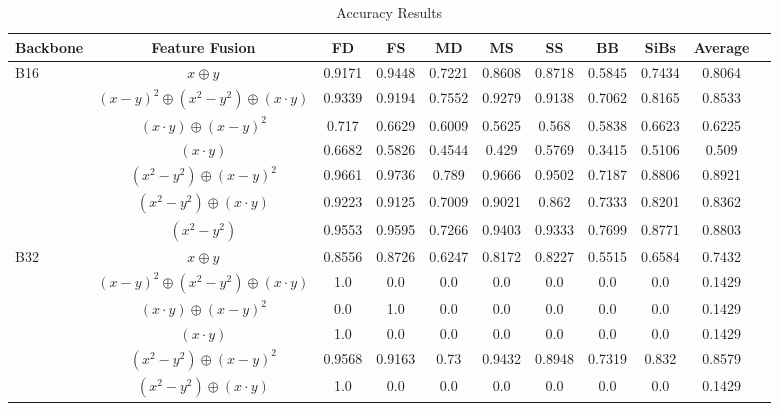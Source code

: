\documentclass{article}
\begin{document}
\begin{table}[htbp]
\centering
\caption{Accuracy Results}
\label{tab:accuracy_results}
\begin{tabular}{lcccccccccc}
\toprule
\textbf{Backbone} & \textbf{Feature Fusion} & \textbf{FD} & \textbf{FS} & \textbf{MD} & \textbf{MS} & \textbf{SS} & \textbf{BB} & \textbf{SiBs} & \textbf{Average} \\
\midrule 
\multirow{7}{*}{B16} & $x \oplus y$  & 0.9171 & 0.9448 & 0.7221 & 0.8608 & 0.8718 & 0.5845 & 0.7434 & 0.8064 \\
& $(x-y)^2 \oplus (x^2-y^2) \oplus (x \cdot y)$  & 0.9339 & 0.9194 & 0.7552 & 0.9279 & 0.9138 & 0.7062 & 0.8165 & 0.8533 \\
& $(x \cdot y) \oplus (x-y)^2$  & 0.717 & 0.6629 & 0.6009 & 0.5625 & 0.568 & 0.5838 & 0.6623 & 0.6225 \\
& $(x \cdot y)$  & 0.6682 & 0.5826 & 0.4544 & 0.429 & 0.5769 & 0.3415 & 0.5106 & 0.509 \\
& $(x^2-y^2) \oplus (x-y)^2$  & 0.9661 & 0.9736 & 0.789 & 0.9666 & 0.9502 & 0.7187 & 0.8806 & 0.8921 \\
& $(x^2-y^2) \oplus (x \cdot y)$  & 0.9223 & 0.9125 & 0.7009 & 0.9021 & 0.862 & 0.7333 & 0.8201 & 0.8362 \\
& $(x^2-y^2)$  & 0.9553 & 0.9595 & 0.7266 & 0.9403 & 0.9333 & 0.7699 & 0.8771 & 0.8803 \\
\midrule 
\multirow{7}{*}{B32} & $x \oplus y$  & 0.8556 & 0.8726 & 0.6247 & 0.8172 & 0.8227 & 0.5515 & 0.6584 & 0.7432 \\
& $(x-y)^2 \oplus (x^2-y^2) \oplus (x \cdot y)$  & 1.0 & 0.0 & 0.0 & 0.0 & 0.0 & 0.0 & 0.0 & 0.1429 \\
& $(x \cdot y) \oplus (x-y)^2$  & 0.0 & 1.0 & 0.0 & 0.0 & 0.0 & 0.0 & 0.0 & 0.1429 \\
& $(x \cdot y)$  & 1.0 & 0.0 & 0.0 & 0.0 & 0.0 & 0.0 & 0.0 & 0.1429 \\
& $(x^2-y^2) \oplus (x-y)^2$  & 0.9568 & 0.9163 & 0.73 & 0.9432 & 0.8948 & 0.7319 & 0.832 & 0.8579 \\
& $(x^2-y^2) \oplus (x \cdot y)$  & 1.0 & 0.0 & 0.0 & 0.0 & 0.0 & 0.0 & 0.0 & 0.1429 \\

\end{tabular}
\end{table}
\end{document}

